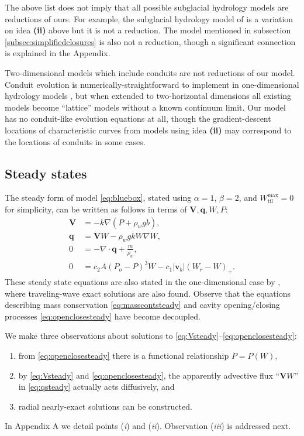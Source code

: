 \documentclass[gmd]{copernicus}   %
\newcommand{\text}{\textrm}
\newcommand\bv{\mathbf{v}}
\newcommand\bV{\mathbf{V}}
\newcommand\bq{\mathbf{q}}
\newcommand{\Div}{\nabla\cdot}
\newcommand{\grad}{\nabla}
\newcommand{\Wtilmax}{W_{\text{til}}^{\text{max}}}
\begin{document}
The above list does not imply that all possible subglacial hydrology models are reductions of ours.  For example, the subglacial hydrology model of \cite{JohnsonFastook} is a variation on idea \textbf{(ii)} above but it is not a reduction.  The \cite{FlowersClarke2002_theory} model mentioned in subsection \ref{subsec:simplifiedclosures} is also not a reduction, though a significant connection is explained in the Appendix.

Two-dimensional models which include conduits \citep{Schoofmeltsupply} are not reductions of our model.  Conduit evolution is numerically-straightforward to implement in one-dimensional hydrology models \citep{Hewittetal2012,vanderWeletal2013}, but when extended to two-horizontal dimensions all existing models \citep{Schoofmeltsupply,Hewitt2013,Werderetal2013} become ``lattice'' models without a known continuum limit.  Our model has no conduit-like evolution equations at all, though the gradient-descent locations of characteristic curves from models using idea \textbf{(ii)} may correspond to the locations of conduits in some cases.

\subsection{Steady states}  \label{subsec:steady}  The steady form of model \eqref{eq:bluebox}, stated using $\alpha=1$, $\beta=2$, and $\Wtilmax=0$ for simplicity, can be written as follows in terms of $\bV,\bq,W,P$:
\begin{align}
\bV &= - k \grad \left(P + \rho_w g b\right), \label{eq:Vsteady} \\
\bq &= \bV W - \rho_w g k W \grad W, \label{eq:qsteady} \\
0 &= - \Div \bq + \frac{m}{\rho_w}, \label{eq:masscontsteady} \\
0 &= c_2 A (P_o - P)^3 W - c_1 |\bv_b| (W_r - W)_+. \label{eq:openclosesteady}
\end{align}
These steady state equations are also stated in the one-dimensional case by \cite{Schoofetal2012}, where traveling-wave exact solutions are also found.  Observe that the equations describing mass conservation \eqref{eq:masscontsteady} and cavity opening/closing processes \eqref{eq:openclosesteady} have become decoupled.

We make three observations about solutions to \eqref{eq:Vsteady}--\eqref{eq:openclosesteady}:
\renewcommand{\labelenumi}{(\emph{\roman{enumi}})}
\begin{enumerate}
\item from \eqref{eq:openclosesteady} there is a functional relationship $P=P(W)$,
\item by \eqref{eq:Vsteady} and \eqref{eq:openclosesteady}, the apparently advective flux ``$\bV W$'' in \eqref{eq:qsteady} actually acts diffusively, and
\item radial nearly-exact solutions can be constructed.
\end{enumerate}
In Appendix A we detail points (\emph{i}) and (\emph{ii}).  Observation (\emph{iii}) is addressed next.
\end{document}
